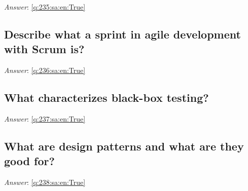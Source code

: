 \documentclass[a4paper,11pt,oneside]{article}
\begin{document}
\begin{sloppypar}
\label{q:235:sa:en:False}

\vspace{2cm}

\noindent\makebox[\textwidth]{\hrulefill}

\vspace{1cm}

\textit{Answer}: \autoref{q:235:sa:en:True}



\subsection{Describe what a sprint in agile development with Scrum is?}

\label{q:236:sa:en:False}

\vspace{2cm}

\noindent\makebox[\textwidth]{\hrulefill}

\vspace{1cm}

\textit{Answer}: \autoref{q:236:sa:en:True}



\subsection{What characterizes black-box testing?}

\label{q:237:sa:en:False}

\vspace{2cm}

\noindent\makebox[\textwidth]{\hrulefill}

\vspace{1cm}

\textit{Answer}: \autoref{q:237:sa:en:True}



\subsection{What are design patterns and what are they good for?}

\label{q:238:sa:en:False}

\vspace{2cm}

\noindent\makebox[\textwidth]{\hrulefill}

\vspace{1cm}

\textit{Answer}: \autoref{q:238:sa:en:True}




\end{sloppypar}
\end{document}

